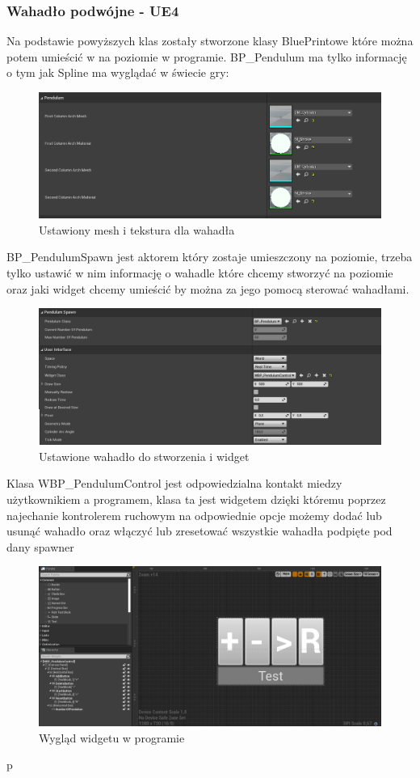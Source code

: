 \documentclass[a4paper,12pt,reqno]{article}
\begin{document}
\subsubsection{Wahadło podwójne - UE4}
{\color{red}

Na podstawie powyższych klas zostały stworzone klasy BluePrintowe które można potem umieścić w na poziomie w programie. BP\_Pendulum ma tylko informację o tym jak Spline ma wyglądać w świecie gry:

\begin{figure}[H]%
\centering
\includegraphics[width=0.7\columnwidth]{graphics/pendulum/PendulumBP.png}
\caption{Ustawiony mesh i tekstura dla wahadła 
\label{BPExample}}%
%
\qquad
\end{figure}  

BP\_PendulumSpawn jest aktorem który zostaje umieszczony na poziomie, trzeba tylko ustawić w nim informację o wahadle które chcemy stworzyć na poziomie oraz jaki widget chcemy umieścić by można za jego pomocą sterować wahadłami.

\begin{figure}[H]%
\centering
\includegraphics[width=0.7\columnwidth]{graphics/pendulum/PendulumSpawnerBP.png}
\caption{Ustawione wahadło do stworzenia i widget 
\label{BPExample}}%
%
\qquad
\end{figure}  

Klasa WBP\_PendulumControl jest odpowiedzialna kontakt miedzy użytkownikiem a programem, klasa ta jest widgetem dzięki któremu poprzez najechanie kontrolerem ruchowym na odpowiednie opcje możemy dodać lub usunąć wahadło oraz włączyć lub zresetować wszystkie wahadła podpięte pod dany spawner 

\begin{figure}[H]%
\centering
\includegraphics[width=0.7\columnwidth]{graphics/pendulum/PendulumControlBP.png}
\caption{Wygląd widgetu w programie
\label{BPExample}}%
%
\qquad
\end{figure}  
p}
\end{document}

